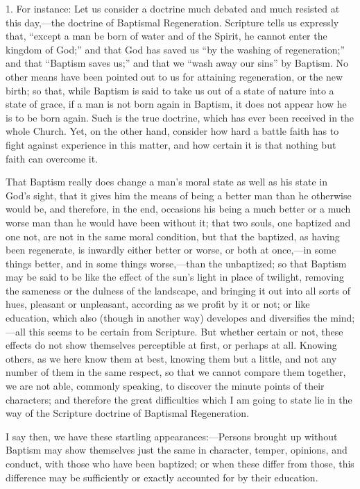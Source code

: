 1. For instance: Let us consider a doctrine much debated and much
resisted at this day,—the doctrine of Baptismal Regeneration.
Scripture tells us expressly that, ``except a man be born of water
and of the Spirit, he cannot enter the kingdom of God;'' and that
God has saved us ``by the washing of regeneration;'' and that
``Baptism saves us;'' and that we ``wash away our
sins'' by Baptism. No other means have been pointed out to us for
attaining regeneration, or the new birth; so that, while Baptism is
said to take us out of a state of nature into a state of grace, if a
man is not born again in Baptism, it does not appear how he is to be
born again. Such is the true doctrine, which has ever been received in
the whole Church. Yet, on the other hand, consider how hard a battle
faith has to fight against experience in this matter, and how certain
it is that nothing but faith can overcome it.

That Baptism really does change a man's moral state as well as his
state in God's sight, that it gives him the means of being a better
man than he otherwise would be, and therefore, in the end, occasions
his being a much better or a much worse man than he would have been
without it; that two souls, one baptized and one not, are not in the
same moral condition, but that the baptized, as having been
regenerate, is inwardly either better or worse, or both at once,—in
some things better, and in some things worse,—than the unbaptized;
so that Baptism may be said to be like the effect of the sun's light
in place of twilight, removing the sameness or the dulness of the
landscape, and bringing it out into all sorts of hues, pleasant or
unpleasant, according as we profit by it or not; or like education,
which also (though in another way) developes and diversifies the mind;—all
this seems to be certain from Scripture. But whether certain or not,
these effects do not show themselves perceptible at first, or perhaps
at all. Knowing others, as we here know them at best, knowing them but
a little, and not any number of them in the same respect, so that we
cannot compare them together, we are not able, commonly speaking, to
discover the minute points of their characters; and therefore the
great difficulties which I am going to state lie in the way of the
Scripture doctrine of Baptismal Regeneration.

I say then, we have these startling appearances:—Persons brought
up without Baptism may show themselves just the same in character,
temper, opinions, and conduct, with those who have been baptized; or
when these differ from those, this difference may be sufficiently or
exactly accounted for by their education.

